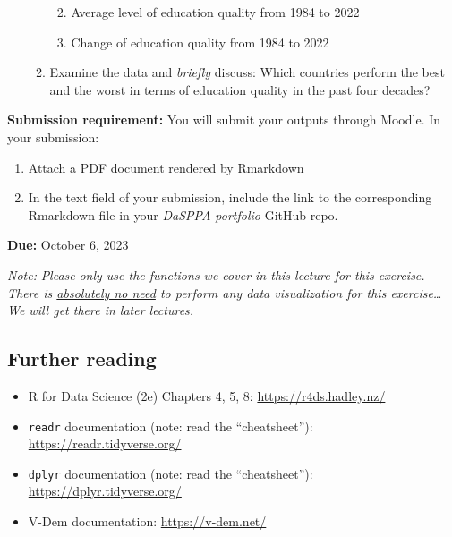 \documentclass[
]{article}
\providecommand{\tightlist}{%
  \setlength{\itemsep}{0pt}\setlength{\parskip}{0pt}}
\begin{document}
\begin{enumerate}
\begin{enumerate}
    \begin{enumerate}
    \def\labelenumiii{\arabic{enumiii}.}
    \item
      Average level of education quality from 1984 to 2022
    \item
      Change of education quality from 1984 to 2022
    \end{enumerate}
  \item
    Examine the data and \emph{briefly} discuss: Which countries perform
    the best and the worst in terms of education quality in the past
    four decades?
  \end{enumerate}
\end{enumerate}

\textbf{Submission requirement:} You will submit your outputs through
Moodle. In your submission:

\begin{enumerate}
\def\labelenumi{\arabic{enumi}.}
\tightlist
\item
  Attach a PDF document rendered by Rmarkdown
\item
  In the text field of your submission, include the link to the
  corresponding Rmarkdown file in your \emph{DaSPPA portfolio} GitHub
  repo.
\end{enumerate}

\textbf{Due:} October 6, 2023

\emph{Note:} \emph{Please} \emph{only use the functions we cover in this
lecture for this exercise. There is \uline{absolutely no need} to
perform any data visualization for this exercise\ldots{} We will get
there in later lectures.}

\hypertarget{further-reading}{%
\subsection{Further reading}\label{further-reading}}

\begin{itemize}
\item
  R for Data Science (2e) Chapters 4, 5, 8:
  \url{https://r4ds.hadley.nz/}
\item
  \texttt{readr} documentation (note: read the ``cheatsheet''):
  \url{https://readr.tidyverse.org/}
\item
  \texttt{dplyr} documentation (note: read the ``cheatsheet''):
  \url{https://dplyr.tidyverse.org/}
\item
  V-Dem documentation: \url{https://v-dem.net/}
\end{itemize}
\end{document}
